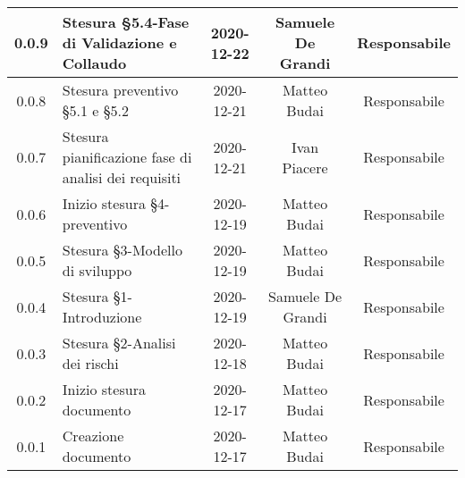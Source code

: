 \begin{center}
\begin{longtable}{|c|p{5cm}|c|c|c|}
	\hline
	0.0.9 & Stesura §5.4-Fase di Validazione e Collaudo & 2020-12-22 & Samuele De Grandi & Responsabile \\
	\hline
	0.0.8 & Stesura preventivo §5.1 e §5.2 & 2020-12-21 & Matteo Budai & Responsabile \\
	\hline
	0.0.7 & Stesura pianificazione fase di analisi dei requisiti & 2020-12-21 & Ivan Piacere & Responsabile \\
	\hline
	0.0.6 & Inizio stesura §4-preventivo & 2020-12-19 & Matteo Budai & Responsabile \\
	\hline
	0.0.5 & Stesura §3-Modello di sviluppo & 2020-12-19 & Matteo Budai & Responsabile \\
	\hline
	0.0.4 & Stesura §1-Introduzione & 2020-12-19 & Samuele De Grandi & Responsabile \\
	\hline
	0.0.3 & Stesura §2-Analisi dei rischi & 2020-12-18 & Matteo Budai & Responsabile \\
	\hline
	0.0.2 & Inizio stesura documento & 2020-12-17 & Matteo Budai & Responsabile \\
	\hline
	0.0.1 & Creazione documento & 2020-12-17 & Matteo Budai & Responsabile \\
	\hline

	\end{longtable}
\end{center}